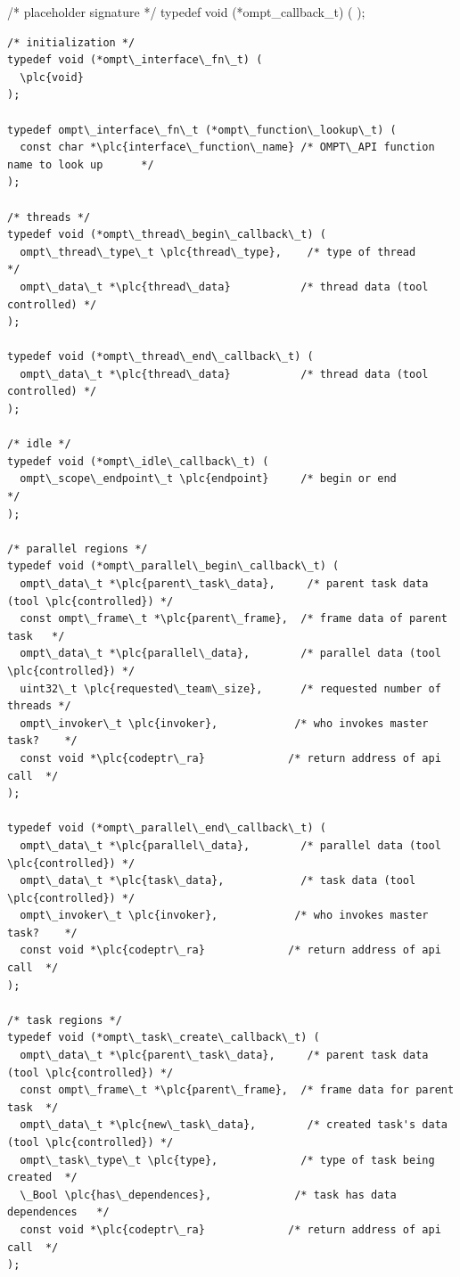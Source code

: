 \documentclass{article}
\begin{document}
\begin{boxedcode}
/* placeholder signature  */
typedef void (*ompt\_callback\_t) (    
);

\begin{verbatim}
/* initialization */
typedef void (*ompt\_interface\_fn\_t) (
  \plc{void}
);

typedef ompt\_interface\_fn\_t (*ompt\_function\_lookup\_t) (
  const char *\plc{interface\_function\_name} /* OMPT\_API function name to look up      */
);

/* threads */
typedef void (*ompt\_thread\_begin\_callback\_t) (
  ompt\_thread\_type\_t \plc{thread\_type},    /* type of thread              */
  ompt\_data\_t *\plc{thread\_data}           /* thread data (tool controlled) */
);

typedef void (*ompt\_thread\_end\_callback\_t) (
  ompt\_data\_t *\plc{thread\_data}           /* thread data (tool controlled) */
);

/* idle */
typedef void (*ompt\_idle\_callback\_t) ( 
  ompt\_scope\_endpoint\_t \plc{endpoint}     /* begin or end                */
);

/* parallel regions */
typedef void (*ompt\_parallel\_begin\_callback\_t) (
  ompt\_data\_t *\plc{parent\_task\_data},     /* parent task data (tool \plc{controlled}) */
  const ompt\_frame\_t *\plc{parent\_frame},  /* frame data of parent task   */
  ompt\_data\_t *\plc{parallel\_data},        /* parallel data (tool \plc{controlled}) */
  uint32\_t \plc{requested\_team\_size},      /* requested number of threads */
  ompt\_invoker\_t \plc{invoker},            /* who invokes master task?    */
  const void *\plc{codeptr\_ra}             /* return address of api call  */ 
);

typedef void (*ompt\_parallel\_end\_callback\_t) (
  ompt\_data\_t *\plc{parallel\_data},        /* parallel data (tool \plc{controlled}) */
  ompt\_data\_t *\plc{task\_data},            /* task data (tool \plc{controlled}) */
  ompt\_invoker\_t \plc{invoker},            /* who invokes master task?    */
  const void *\plc{codeptr\_ra}             /* return address of api call  */ 
);

/* task regions */
typedef void (*ompt\_task\_create\_callback\_t) ( 
  ompt\_data\_t *\plc{parent\_task\_data},     /* parent task data (tool \plc{controlled}) */
  const ompt\_frame\_t *\plc{parent\_frame},  /* frame data for parent task  */
  ompt\_data\_t *\plc{new\_task\_data},        /* created task's data (tool \plc{controlled}) */
  ompt\_task\_type\_t \plc{type},             /* type of task being created  */ 
  \_Bool \plc{has\_dependences},             /* task has data dependences   */
  const void *\plc{codeptr\_ra}             /* return address of api call  */ 
);


\end{verbatim}
\end{boxedcode}
\end{document}
